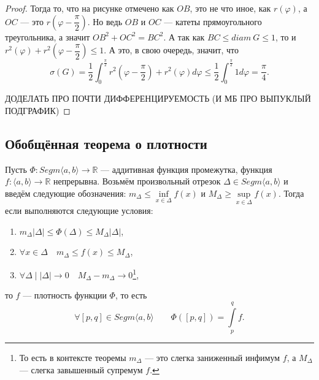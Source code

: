 \begin{proof}
	Тогда то, что на рисунке отмечено как \(OB\), это не что иное, как \(r(\varphi)\), а \(OC\) --- это \(r \left(\varphi - \dfrac{\pi}{2} \right)\). Но ведь \(OB\) и \(OC\) --- катеты прямоугольного треугольника, а значит \({OB}^2 + {OC}^2 = {BC}^2\). А так как \(BC \leqslant diam \ G \leqslant 1\), то и \(r^2(\varphi) + r^2 \left(\varphi - \dfrac{\pi}{2} \right) \leqslant 1\). А это, в свою очередь, значит, что \[
		\sigma(G) = \frac{1}{2} \int_{0}^{\frac{\pi}{2}} r^2 \left(\varphi - \frac{\pi}{2} \right) +  r^2(\varphi) d\varphi \leqslant \frac{1}{2} \int_{0}^{\frac{\pi}{2}} 1 d\varphi = \frac{\pi}{4}.
	\]
	
	ДОДЕЛАТЬ ПРО ПОЧТИ ДИФФЕРЕНЦИРУЕМОСТЬ (И МБ ПРО ВЫПУКЛЫЙ ПОДГРАФИК)
\end{proof}

\subsection{Обобщённая теорема о плотности}

\hypertarget{plotn}{}
\begin{theorem}
	Пусть \(\Phi \colon Segm \langle a, b \rangle \to \mathbb{R}\) --- аддитивная функция промежутка, функция \(f \colon \langle a, b \rangle \to \mathbb{R}\) непрерывна. Возьмём произвольный отрезок \(\Delta \in Segm \langle a, b \rangle\) и введём следующие обозначения: \(m_\Delta \leqslant \inf\limits_{x \in \Delta} f(x)\) и \(M_\Delta \geqslant \sup\limits_{x \in \Delta} f(x)\). Тогда если выполняются следующие условия:
	\begin{enumerate}
		\item \label{plotn_1} \(m_\Delta |\Delta| \leqslant \Phi(\Delta) \leqslant M_\Delta |\Delta|\),
		\item \label{plotn_2} \(\forall x \in \Delta \quad m_\Delta \leqslant f(x) \leqslant M_\Delta\),
		\item \label{plotn_3} \(\forall \Delta \mid |\Delta| \to 0 \quad M_\Delta - m_\Delta \to 0\)\footnote{То есть в контексте теоремы \(m_\Delta\) --- это слегка заниженный инфимум \(f\), а \(M_\Delta\) --- слегка завышенный супремум \(f\).},
	\end{enumerate}
	то \(f\) --- плотность функции \(\Phi\), то есть \[
		\forall [p, q] \in Segm \langle a, b \rangle \qquad \Phi([p, q]) = \int\limits_p^q f.
	\]
\end{theorem}

